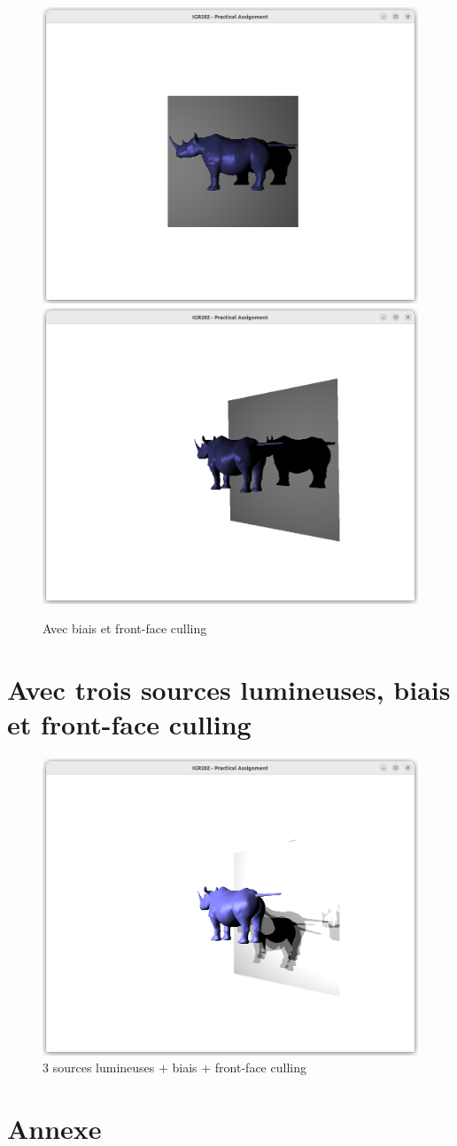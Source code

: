\documentclass{article}
\begin{document}
\begin{figure}[h]
    \centering
    \includegraphics[width=0.48\linewidth]{images/cullFaceEtBias-1.png}
    \includegraphics[width=0.48\linewidth]{images/cullFaceEtBias-2.png}
    \caption{Avec biais et front-face culling}
    \label{fig:cullFaceEtBias}
\end{figure}

\section{Avec trois sources lumineuses, biais et front-face culling}

\begin{figure}[h]
    \centering
    \includegraphics[width=0.5\linewidth]{images/cullFaceEtBiasMultipleLights.png}
    \caption{3 sources lumineuses + biais + front-face culling}
    \label{fig:cullFaceEtBiasMultipleLights}
\end{figure}

\section{Annexe}
\end{document}
